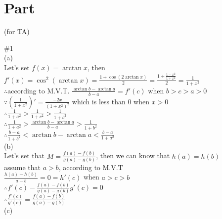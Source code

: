 \documentclass{article}
\begin{document}
\section{\textcolor[rgb]{0.70,0.00,0.00}{Part \uppercase\expandafter{}}}(for TA)

\vspace{3.5mm}

\textcolor[rgb]{0.00,0.00,0.50}{\#1}\\

(a)\\

Let's set $f(x)=\arctan x$, then $f'(x)=\cos^2(\arctan x)=\displaystyle\frac{1+\cos(2\arctan x)}{2}=\frac{1+\frac{1-x^2}{1+x^2}}{2}=\frac{1}{1+x^2}$\\

$\therefore$\qquad according to M.V.T. $\displaystyle\frac{\arctan b-\arctan a}{b-a}=f'(c)$ when $b>c>a>0$\\

$\because$\qquad $(\displaystyle\frac{1}{1+x^2})'=\frac{-2x}{(1+x^2)^2}$ which is less than $0$ when $x>0$\\

$\therefore$\qquad$\displaystyle\frac{1}{1+a^2}>\frac{1}{1+c^2}>\frac{1}{1+b^2}$\\

$\therefore$\qquad$\displaystyle\frac{1}{1+a^2}>\frac{\arctan b-\arctan a}{b-a}>\frac{1}{1+b^2}$\\

$\therefore$\qquad$\displaystyle\frac{b-a}{1+b^2}<\arctan b-\arctan a<\frac{b-a}{1+a^2}$\\

(b)\\

Let's set that $M=\displaystyle\frac{f(a)-f(b)}{g(a)-g(b)}$, then we can know that $h(a)=h(b)$\\

assume that $a>b$, according to M.V.T\\

$\displaystyle\frac{h(a)-h(b)}{a-b}=0=h'(c)$ when $a>c>b$\\

$\therefore$\qquad$f'(c)-\displaystyle\frac{f(a)-f(b)}{g(a)-g(b)}g'(c)=0$\\

$\therefore$\qquad$\displaystyle\frac{f'(c)}{g'(c)}=\frac{f(a)-f(b)}{g(a)-g(b)}$\\

(c)\\
\end{document}
